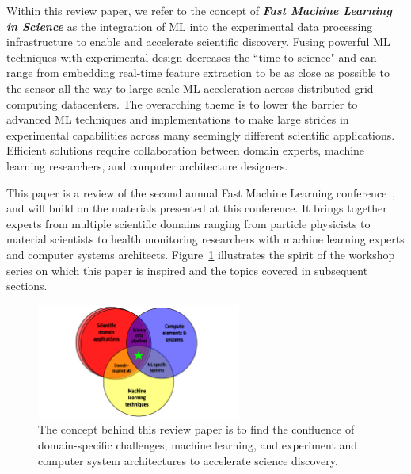 \begin{tcolorbox}
Within this review paper, we refer to the concept of \textit{\textbf{Fast Machine Learning in Science}} as the integration of ML into the experimental data processing infrastructure to enable and accelerate scientific discovery. Fusing powerful ML techniques with experimental design decreases the ``time to science" and can range from embedding real-time feature extraction to be as close as possible to the sensor all the way to large scale ML acceleration across distributed grid computing datacenters. 
The overarching theme is to lower the barrier to advanced ML techniques and implementations to make large strides in experimental capabilities across many seemingly different scientific applications.  
Efficient solutions require collaboration between domain experts, machine learning researchers, and computer architecture designers.  
\end{tcolorbox}
 
This paper is a review of the second annual Fast Machine Learning conference~\cite{FMLConf2}, and will build on the materials presented at this conference. 
It brings together experts from multiple scientific domains ranging from particle physicists to material scientists to health monitoring researchers with machine learning experts and computer systems architects. 
Figure~\ref{fig:intro} illustrates the spirit of the workshop series on which this paper is inspired and the topics covered in subsequent sections.  

\begin{figure}[tbh!]
    \centering
    \includegraphics[width=0.6\textwidth]{figures/fastmlintro.pdf}
    \caption{The concept behind this review paper is to find the confluence of domain-specific challenges, machine learning, and experiment and computer system architectures to accelerate science discovery.}
    \label{fig:intro}
\end{figure}



